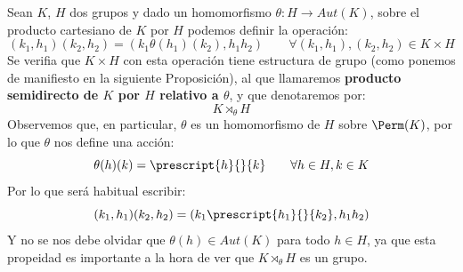 \begin{definicion}
    Sean $K$, $H$ dos grupos y dado un homomorfismo $\theta:H\to Aut(K)$, sobre el producto cartesiano de $K$ por $H$ podemos definir la operación:
    \begin{equation*}
        (k_1,h_1)(k_2,h_2) = (k_1\theta(h_1)(k_2), h_1h_2) \qquad \forall (k_1,h_1),(k_2,h_2) \in K\times H
    \end{equation*}
    Se verifia que $K\times H$ con esta operación tiene estructura de grupo (como ponemos de manifiesto en la siguiente Proposición), al que llamaremos \textbf{producto semidirecto de $K$ por $H$ relativo a $\theta$}, y que denotaremos por:
    \begin{equation*}
        K\rtimes_\theta H
    \end{equation*}
    Observemos que, en particular, $\theta$ es un homomorfismo de $H$ sobre $\Perm(K)$, por lo que $\theta$ nos define una acción:
    \begin{equation*}
        \theta(h)(k) = \prescript{h}{}{k} \qquad \forall h\in H, k\in K
    \end{equation*}
    Por lo que será habitual escribir:
    \begin{equation*}
        (k_1,h_1)(k_2,h_2) = (k_1 \prescript{h_1}{}{k_2}, h_1h_2)
    \end{equation*}
    Y no se nos debe olvidar que $\theta(h) \in Aut(K)$ para todo $h\in H$, ya que esta propeidad es importante a la hora de ver que $K\rtimes_\theta H$ es un grupo.
\end{definicion}

